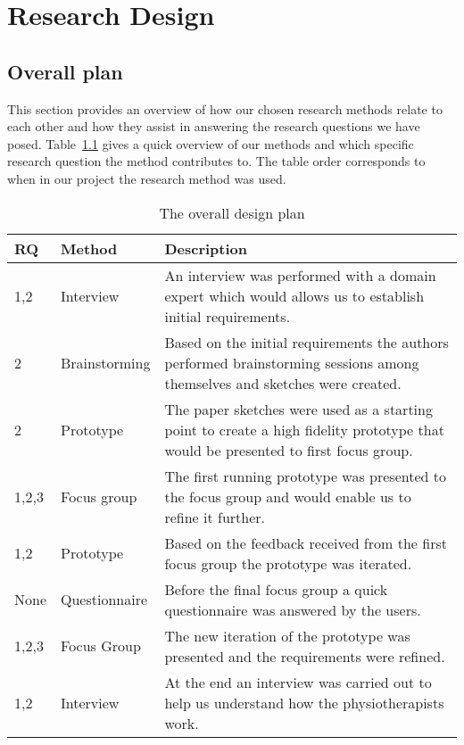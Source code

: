 \chapter{Research Design}

\section{Overall plan}
\label{sec:overview}

This section provides an overview of how our chosen research methods relate to each other and how they assist in answering the research questions we have posed. Table~\ref{tab:designPlan} gives a quick overview of our methods and which specific research question the method contributes to. The table order corresponds to when in our project the research method was used.

\begin{table}[h!]
  \centering
  \begin{tabular}{|p{0.7cm}|p{2cm}|p{9cm}|}
    \hline
    \textbf{RQ} & \textbf{Method} & \textbf{Description} \\ \hline
    1,2 & Interview & An interview was performed with a domain expert which would allows us to establish initial requirements. \\ \hline
    2 & Brainstorming & Based on the initial requirements the authors performed brainstorming sessions among themselves and sketches were created. \\ \hline
    2 & Prototype & The paper sketches were used as a starting point to create a high fidelity prototype that would be presented to first focus group. \\ \hline
    1,2,3 & Focus group & The first running prototype was presented to the focus group and would enable us to refine it further. \\ \hline
    1,2 & Prototype & Based on the feedback received from the first focus group the prototype was iterated. \\ \hline
    None & Questionnaire & Before the final focus group a quick questionnaire was answered by the users. \\ \hline
    1,2,3 & Focus Group & The new iteration of the prototype was presented and the requirements were refined. \\ \hline
    1,2 & Interview & At the end an interview was carried out to help us understand how the physiotherapists work. \\ \hline
  \end{tabular}
  \caption{The overall design plan}
  \label{tab:designPlan}
\end{table}

